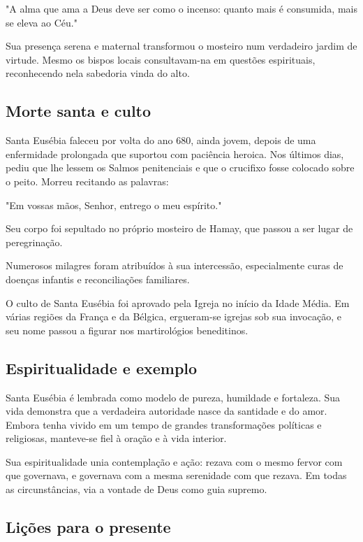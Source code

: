 \documentclass[a4paper,14pt]{extarticle} \usepackage[utf8]{inputenc}
\begin{document}
"A alma que ama a Deus deve ser como o incenso: quanto mais é consumida, mais se eleva ao Céu."

Sua presença serena e maternal transformou o mosteiro num verdadeiro jardim de virtude. Mesmo os bispos locais consultavam-na em questões espirituais, reconhecendo nela sabedoria vinda do alto.

\subsection{Morte santa e culto}

Santa Eusébia faleceu por volta do ano 680, ainda jovem, depois de uma enfermidade prolongada que suportou com paciência heroica. Nos últimos dias, pediu que lhe lessem os Salmos penitenciais e que o crucifixo fosse colocado sobre o peito. Morreu recitando as palavras:

"Em vossas mãos, Senhor, entrego o meu espírito."

Seu corpo foi sepultado no próprio mosteiro de Hamay, que passou a ser lugar de peregrinação.

Numerosos milagres foram atribuídos à sua intercessão, especialmente curas de doenças infantis e reconciliações familiares.

O culto de Santa Eusébia foi aprovado pela Igreja no início da Idade Média. Em várias regiões da França e da Bélgica, ergueram-se igrejas sob sua invocação, e seu nome passou a figurar nos martirológios beneditinos.

\subsection{Espiritualidade e exemplo}

Santa Eusébia é lembrada como modelo de pureza, humildade e fortaleza. Sua vida demonstra que a verdadeira autoridade nasce da santidade e do amor. Embora tenha vivido em um tempo de grandes transformações políticas e religiosas, manteve-se fiel à oração e à vida interior.

Sua espiritualidade unia contemplação e ação: rezava com o mesmo fervor com que governava, e governava com a mesma serenidade com que rezava. Em todas as circunstâncias, via a vontade de Deus como guia supremo.

\subsection{Lições para o presente}
\end{document}
